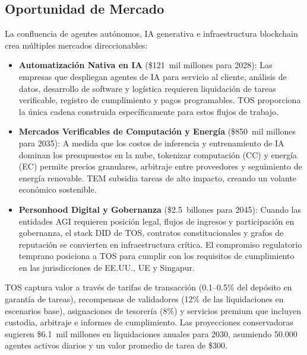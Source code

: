 \documentclass[11pt]{article}
\begin{document}
\subsection{Oportunidad de Mercado}
La confluencia de agentes autónomos, IA generativa e infraestructura blockchain crea múltiples mercados direccionables:
\begin{itemize}[noitemsep]
  \item \textbf{Automatización Nativa en IA} (\$121~mil millones para 2028): Las empresas que despliegan agentes de IA para servicio al cliente, análisis de datos, desarrollo de software y logística requieren liquidación de tareas verificable, registro de cumplimiento y pagos programables. TOS proporciona la única cadena construida específicamente para estos flujos de trabajo.
  \item \textbf{Mercados Verificables de Computación y Energía} (\$850~mil millones para 2035): A medida que los costos de inferencia y entrenamiento de IA dominan los presupuestos en la nube, tokenizar computación (CC) y energía (EC) permite precios granulares, arbitraje entre proveedores y seguimiento de energía renovable. TEM subsidia tareas de alto impacto, creando un volante económico sostenible.
  \item \textbf{Personhood Digital y Gobernanza} (\$2.5~billones para 2045): Cuando las entidades AGI requieren posición legal, flujos de ingresos y participación en gobernanza, el stack DID de TOS, contratos constitucionales y grafos de reputación se convierten en infraestructura crítica. El compromiso regulatorio temprano posiciona a TOS para cumplir con los requisitos de cumplimiento en las jurisdicciones de EE.UU., UE y Singapur.
\end{itemize}

TOS captura valor a través de tarifas de transacción (0.1--0.5\% del depósito en garantía de tareas), recompensas de validadores (12\% de las liquidaciones en escenarios base), asignaciones de tesorería (8\%) y servicios premium que incluyen custodia, arbitraje e informes de cumplimiento. Las proyecciones conservadoras sugieren \$6.1~mil millones en liquidaciones anuales para 2030, asumiendo 50.000 agentes activos diarios y un valor promedio de tarea de \$300.
\end{document}
